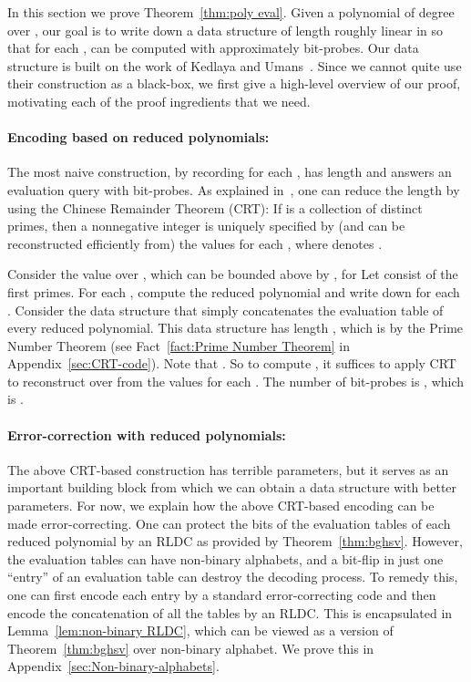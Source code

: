 \documentclass[11pt,english]{article}
\theoremstyle{definition}
\theoremstyle{remark}
\begin{document}
In this section we prove Theorem~\ref{thm:poly eval}. Given a polynomial
 of degree  over , our goal is to write down a data
structure of length roughly linear in  so that for each
,  can be computed with approximately 
bit-probes. Our data structure is built on the work of Kedlaya and
Umans~\cite{kedl-umans}. Since we cannot quite use their construction
as a black-box, we first give a high-level overview of our proof,
motivating each of the proof ingredients that we need.

\paragraph{\textbf{Encoding based on reduced polynomials:}}

The most naive construction, by recording  for each ,
has length  and answers an evaluation query with 
bit-probes. As explained in~\cite{kedl-umans}, one can
reduce the length by using the Chinese Remainder Theorem (CRT): If
 is a collection of distinct primes, then a nonnegative integer
 is uniquely specified by (and can be reconstructed
efficiently from) the values  for each , where
 denotes . 

Consider the value  over , which can be bounded above
by , for  Let  consist of the first
 primes. For each , compute the reduced
polynomial  and write down  for each .
Consider the data structure that simply concatenates the evaluation
table of every reduced polynomial. This data structure has length
, which is 
by the Prime Number Theorem (see Fact~\ref{fact:Prime Number Theorem}
in Appendix~\ref{sec:CRT-code}). Note that . 
So to compute , it suffices to apply CRT to reconstruct
 over  from the values  for
each . The number of bit-probes is ,
which is . 

\paragraph{\textbf{Error-correction with reduced polynomials:}}

The above CRT-based construction has terrible parameters, but it serves
as an important building block from which we can obtain a data structure
with better parameters. For now, we explain how the above CRT-based
encoding can be made error-correcting. One can protect the bits of
the evaluation tables of each reduced polynomial by an RLDC as provided
by Theorem~\ref{thm:bghsv}. However, the evaluation tables can have
non-binary alphabets, and a bit-flip in just one ``entry'' of
an evaluation table can destroy the decoding process. To remedy this,
one can first encode each entry by a standard error-correcting code
and then encode the concatenation of all the tables by an RLDC. This
is encapsulated in Lemma~\ref{lem:non-binary RLDC}, which can be
viewed as a version of Theorem~\ref{thm:bghsv} over non-binary alphabet.
We prove this in Appendix~\ref{sec:Non-binary-alphabets}. 
\end{document}
